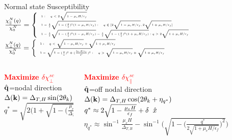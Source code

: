 \documentclass{beamer}
\newcommand\Fontvii{\fontsize{4}{4}\selectfont}
\begin{document}
\begin{frame}
Normal state Susceptibility \\[1cm]
${\Fontvii\frac{\chi^N_\parallel(q)}{\chi^N_0} = \left\{
     \begin{array}{lr}
       1: \quad q < 2\sqrt{1-\mu_e H/\epsilon_f}\\
       1-\frac{1}{2}\sqrt{1-(\frac{2}{q})^2(1-\mu_e H/\epsilon_f)}: \quad q \in [2\sqrt{1-\mu_e H/\epsilon_f},2\sqrt{1+\mu_e H/\epsilon_f}] \\
       1-\frac{1}{2}\sqrt{1-(\frac{2}{q})^2(1-\mu_e H/\epsilon_f)}-\frac{1}{2}\sqrt{1-(\frac{2}{q})^2(1+\mu_e H/\epsilon_f)}: q > 2\sqrt{1+\mu_e H/\epsilon_f}
     \end{array}
   \right. }$ \\[1cm]
${\Fontvii\frac{\chi^N_\perp(q)}{\chi^N_0} = \left\{
     \begin{array}{lr}
       1 :\quad q < \sqrt{1-\mu_e H/\epsilon_f}+\sqrt{1+\mu_e H/\epsilon_f} \\
       1-\sqrt{1-(\frac{2}{q})^2+(\frac{2\mu_e H/\epsilon_f}{q^2})^2} : \quad q >\sqrt{1-\mu_e H/\epsilon_f}+\sqrt{1+\mu_e H/\epsilon_f}
     \end{array}
   \right.}$
   
    \begin{columns}
    \begin{column}{0.5\textwidth}
      \centering
      \textcolor{red}{\bf Maximize $\delta\chi^{sc}_{\perp}$} \\
      $\hat{\bf q}$=nodal direction \\
	 $\Delta({\bf k})=\Delta_{T,H}\sin({2\theta_k})$ \\
        $q^*=\sqrt{2(1+\sqrt{1-\bigg(\frac{\mu_eH}{\Delta_{T,B}}\bigg)^2}}\hat{x}$
      \end{column}
    \begin{column}{0.5\textwidth}\centering	
	\textcolor{red}{\bf Maximize $\delta\chi^{sc}_{\parallel}$} \\
	$\hat{\bf q}$=off nodal direction \\
     	$\Delta({\bf k})=\Delta_{T,H}\cos({2\theta_k +\eta_{q^*}})$ \\
        $q^*\approx2\sqrt{1-\frac{\mu_eH}{\epsilon_f}}+\delta\hspace{0.2cm}\hat{x}$
        {\Fontvii$\eta_{q^*}\approx\sin^{-1}\frac{\mu_e H}{\Delta_{T,B}}-\sin^{-1}\bigg(\sqrt{1-\big(\frac{q^*}{2\sqrt{1+\mu_eH/\epsilon_f}}\big)^2}\bigg)$}   \\
	\end{column}
  \end{columns}
\end{frame}
\end{document}
